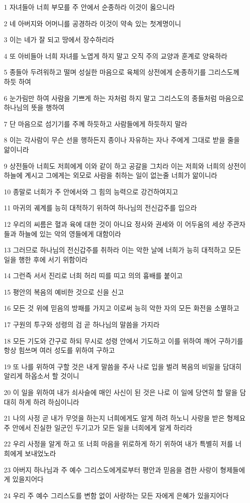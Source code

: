 \par 1 자녀들아 너희 부모를 주 안에서 순종하라 이것이 옳으니라
\par 2 네 아버지와 어머니를 공경하라 이것이 약속 있는 첫계명이니
\par 3 이는 네가 잘 되고 땅에서 장수하리라
\par 4 또 아비들아 너희 자녀를 노엽게 하지 말고 오직 주의 교양과 훈계로 양육하라
\par 5 종들아 두려워하고 떨며 성실한 마음으로 육체의 상전에게 순종하기를 그리스도께 하듯 하여
\par 6 눈가림만 하여 사람을 기쁘게 하는 자처럼 하지 말고 그리스도의 종들처럼 마음으로 하나님의 뜻을 행하여
\par 7 단 마음으로 섬기기를 주께 하듯하고 사람들에게 하듯하지 말라
\par 8 이는 각사람이 무슨 선을 행하든지 종이나 자유하는 자나 주에게 그대로 받을 줄을 앎이니라
\par 9 상전들아 너희도 저희에게 이와 같이 하고 공갈을 그치라 이는 저희와 너희의 상전이 하늘에 계시고 그에게는 외모로 사람을 취하는 일이 없는줄 너희가 앎이니라
\par 10 종말로 너희가 주 안에서와 그 힘의 능력으로 강건하여지고
\par 11 마귀의 궤계를 능히 대적하기 위하여 하나님의 전신갑주를 입으라
\par 12 우리의 씨름은 혈과 육에 대한 것이 아니요 정사와 권세와 이 어두움의 세상 주관자들과 하늘에 있는 악의 영들에게 대함이라
\par 13 그러므로 하나님의 전신갑주를 취하라 이는 악한 날에 너희가 능히 대적하고 모든 일을 행한 후에 서기 위함이라
\par 14 그런즉 서서 진리로 너희 허리 띠를 띠고 의의 흉배를 붙이고
\par 15 평안의 복음의 예비한 것으로 신을 신고
\par 16 모든 것 위에 믿음의 방패를 가지고 이로써 능히 악한 자의 모든 화전을 소멸하고
\par 17 구원의 투구와 성령의 검 곧 하나님의 말씀을 가지라
\par 18 모든 기도와 간구로 하되 무시로 성령 안에서 기도하고 이를 위하여 깨어 구하기를 항상 힘쓰며 여러 성도를 위하여 구하고
\par 19 또 나를 위하여 구할 것은 내게 말씀을 주사 나로 입을 벌려 복음의 비밀을 담대히 알리게 하옵소서 할 것이니
\par 20 이 일을 위하여 내가 쇠사슬에 매인 사신이 된 것은 나로 이 일에 당연히 할 말을 담대히 하게 하려 하심이니라
\par 21 나의 사정 곧 내가 무엇을 하는지 너희에게도 알게 하려 하노니 사랑을 받은 형제요 주 안에서 진실한 일군인 두기고가 모든 일을 너희에게 알게 하리라
\par 22 우리 사정을 알게 하고 또 너희 마음을 위로하게 하기 위하여 내가 특별히 저를 너희에게 보내었노라
\par 23 아버지 하나님과 주 예수 그리스도에게로부터 평안과 믿음을 겸한 사랑이 형제들에게 있을지어다
\par 24 우리 주 예수 그리스도를 변함 없이 사랑하는 모든 자에게 은혜가 있을지어다



